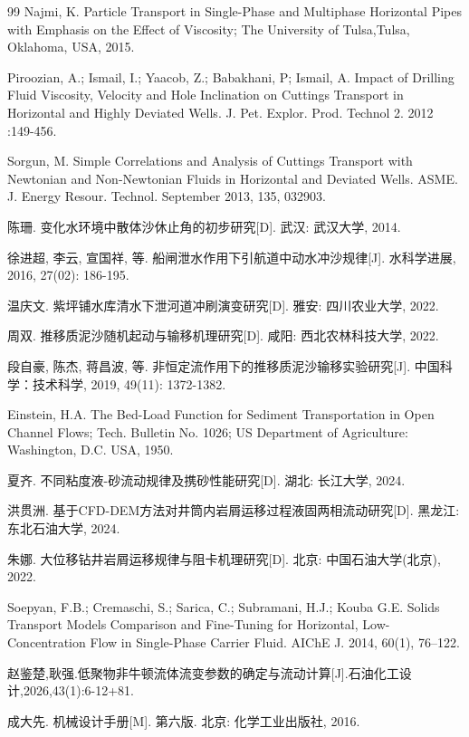 \begin{thebibliography}{99}
Najmi, K. Particle Transport in Single-Phase and Multiphase Horizontal Pipes with Emphasis on the Effect of Viscosity; The University of Tulsa,Tulsa, Oklahoma, USA, 2015.


Piroozian, A.; Ismail, I.; Yaacob, Z.; Babakhani, P; Ismail, A. Impact of Drilling Fluid Viscosity, Velocity and Hole Inclination on Cuttings Transport in Horizontal and Highly Deviated Wells. J. Pet. Explor. Prod. Technol 2. 2012 :149-456.


Sorgun, M. Simple Correlations and Analysis of Cuttings Transport with Newtonian and Non-Newtonian Fluids in Horizontal and Deviated Wells. ASME. J. Energy Resour. Technol. September 2013, 135, 032903.


陈珊. 变化水环境中散体沙休止角的初步研究[D]. 武汉: 武汉大学, 2014.


徐进超, 李云, 宣国祥, 等. 船闸泄水作用下引航道中动水冲沙规律[J]. 水科学进展, 2016, 27(02): 186-195.


温庆文. 紫坪铺水库清水下泄河道冲刷演变研究[D]. 雅安: 四川农业大学, 2022.


周双. 推移质泥沙随机起动与输移机理研究[D]. 咸阳: 西北农林科技大学, 2022.


段自豪, 陈杰, 蒋昌波, 等. 非恒定流作用下的推移质泥沙输移实验研究[J]. 中国科学：技术科学, 2019, 49(11): 1372-1382.


Einstein, H.A. The Bed-Load Function for Sediment Transportation in Open Channel Flows; Tech. Bulletin No. 1026; US Department of Agriculture: Washington, D.C. USA, 1950.


夏齐. 不同粘度液-砂流动规律及携砂性能研究[D]. 湖北: 长江大学, 2024.


洪贯洲. 基于CFD-DEM方法对井筒内岩屑运移过程液固两相流动研究[D]. 黑龙江: 东北石油大学, 2024.


朱娜. 大位移钻井岩屑运移规律与阻卡机理研究[D]. 北京: 中国石油大学(北京), 2022.


Soepyan, F.B.; Cremaschi, S.; Sarica, C.; Subramani, H.J.; Kouba G.E. Solids Transport Models Comparison and Fine-Tuning for Horizontal, Low-Concentration Flow in Single-Phase Carrier Fluid. AIChE J. 2014, 60(1), 76–122.


赵鉴楚,耿强.低聚物非牛顿流体流变参数的确定与流动计算[J].石油化工设计,2026,43(1):6-12+81.

成大先. 机械设计手册[M]. 第六版. 北京: 化学工业出版社, 2016.

\end{thebibliography}





